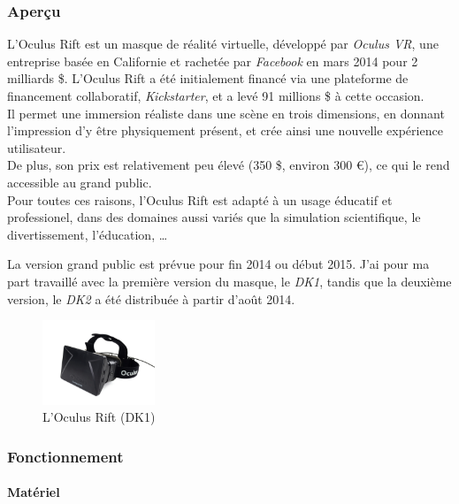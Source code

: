\documentclass[a4paper,french,12pt]{article}
\begin{document}
		\subsubsection{Aperçu}
		  L'Oculus Rift est un masque de réalité virtuelle, développé par \emph{Oculus VR}, une entreprise 
		  basée en Californie et rachetée par \emph{Facebook} en mars 2014 pour  2 milliards \$.
		  L'Oculus Rift a été initialement financé via une plateforme de financement collaboratif, \emph{Kickstarter},
		  et a levé 91 millions \$ à cette occasion. \\
		  Il permet une immersion  réaliste dans une scène en trois dimensions, en donnant l'impression d'y être physiquement
		  présent, et crée ainsi une nouvelle expérience
		  utilisateur. \\
		  De plus, son prix est relativement peu élevé (350 \$, environ 300 \euro), ce qui le rend accessible au grand public. \\
		  Pour toutes ces raisons, l'Oculus Rift est adapté à un usage éducatif et professionel, dans des domaines aussi variés
		  que la simulation scientifique, le divertissement, l'éducation, \ldots
		  
		  La version grand public est prévue pour fin 2014 ou début 2015. J'ai pour ma part travaillé avec la première
		  version du masque, le \emph{DK1}, tandis que la deuxième version, le \emph{DK2} a été distribuée à partir d'août 2014.
		  
		  \begin{figure}[h!]
		    \centering
		      \includegraphics[width=0.3\textwidth]{dk1.jpg}
		    \caption{L'Oculus Rift (DK1)}
		  \end{figure}
		  
		  \subsubsection{Fonctionnement}
		  
			\paragraph{Matériel} ~\\
		    
\end{document}
